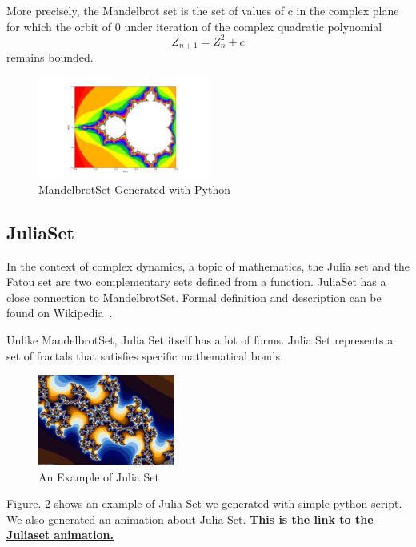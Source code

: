 \documentclass[fleqn,10pt]{SelfArx} %
\begin{document}
More precisely, the Mandelbrot set is the set of values of c in the
complex plane for which the orbit of 0 under iteration of the complex
quadratic polynomial
$$Z_{n+1} = Z^2_n + c$$
remains bounded.



\begin{figure}[h!]
  \centering
      \includegraphics[width=0.5\textwidth]{figure_1.pdf}
  \caption{MandelbrotSet Generated with Python}
\end{figure}


\subsection{JuliaSet}

In the context of complex dynamics, a topic of mathematics, the Julia
set and the Fatou set are two complementary sets  defined from a
function. JuliaSet has a close connection to MandelbrotSet. Formal
definition and description can be found on Wikipedia~\cite{julia_wiki}.


Unlike MandelbrotSet, Julia Set itself has a lot of forms. Julia Set
represents  a set of fractals that satisfies specific mathematical
bonds.

\begin{figure}[h!]
  \centering
      \includegraphics[width=0.4\textwidth]{698.png}
  \caption{An Example of Julia Set}
\end{figure}


Figure. 2 shows an example of Julia Set we generated with simple
python script. We also generated an animation about Julia
Set. \href{http://giphy.com/gifs/l41lUTY3yTLywvYRO?utm_source=facebook&utm_medium=embed&utm_campaign=share}{\bf
  This is the link to the Juliaset animation.}
\end{document}
